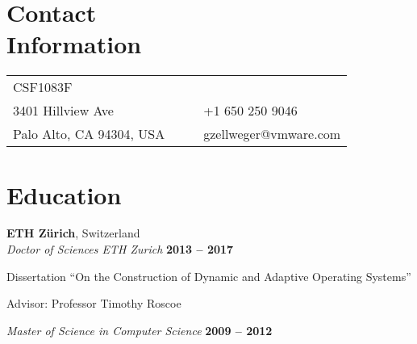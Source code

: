 \documentclass[margin,line]{cv/cv}
\begin{document}
\begin{resume}

    \section{\mysidestyle Contact\\Information}

    \begin{tabularx}{\textwidth}{lXcl}
        CSF1083F                                                                         \\
        3401 Hillview Ave        &  & \raisebox{-3pt}{\Phone}    & +1 650 250 9046       \\
        Palo Alto, CA 94304, USA &  & \raisebox{-3pt}{\Envelope} & gzellweger@vmware.com \\
    \end{tabularx}

    \section{\mysidestyle  Education}

    \textbf{ETH Zürich}, Switzerland \vspace{2mm}\\\vspace{1mm}%
    \textsl{Doctor of Sciences ETH Zurich} \hfill \textbf{2013 -- 2017}\vspace{-3mm}\\\vspace{-1mm}%
    \begin{list2}
        \item Dissertation ``On the Construction of Dynamic and Adaptive Operating Systems''
        \item Advisor: Professor Timothy Roscoe
    \end{list2}\vspace{-1.5mm}

    \textsl{Master of Science in Computer Science} \hfill \textbf{2009 -- 2012}\vspace{-3mm}\\\vspace{-1mm}%


\end{resume}
\end{document}
